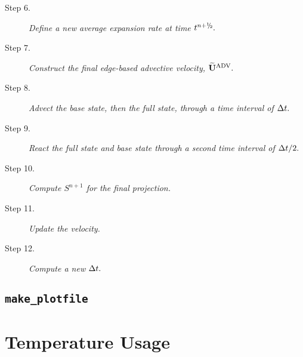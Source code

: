 \begin{description}
\item[Step 6.] {\em Define a new average expansion rate at time $t^\nph.$}\\

\item[Step 7.] {\em Construct the final edge-based advective velocity, $\widetilde{\mathbf{U}}^{\mathrm{ADV}}.$}\\

\item[Step 8.] {\em Advect the base state, then the full state, through a time interval 
of $\Delta t.$}\\

\item[Step 9.] {\em React the full state and base state through a second time interval 
of $\Delta t/2.$}\\

\item[Step 10.] {\em Compute $S^{n+1}$ for the final projection.}\\

\item[Step 11.] {\em Update the velocity.}\\

\item[Step 12.] {\em Compute a new $\Delta t.$}\\

\end{description}
\subsection{{\tt make\_plotfile}}
\section{Temperature Usage}
